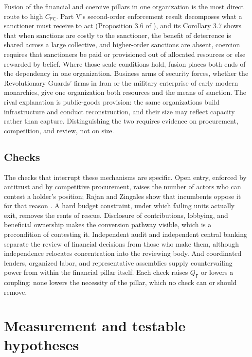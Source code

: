 \documentclass[11pt,letterpaper]{article}
\theoremstyle{definition}
\theoremstyle{remark}
\newcommand{\pF}{\mathsf{F}}
\newcommand{\pC}{\mathsf{C}}
\begin{document}
Fusion of the financial and coercive pillars in one organization is the most direct route to high $C_{\pF\pC}$. Part V's second-order enforcement result decomposes what a sanctioner must receive to act (Proposition 3.6 of \citealt{long2026coercive}), and its Corollary 3.7 shows that when sanctions are costly to the sanctioner, the benefit of deterrence is shared across a large collective, and higher-order sanctions are absent, coercion requires that sanctioners be paid or provisioned out of allocated resources or else rewarded by belief. Where those scale conditions hold, fusion places both ends of the dependency in one organization. Business arms of security forces, whether the Revolutionary Guards' firms in Iran \citep{wehrey2009} or the military enterprise of early modern monarchies, give one organization both resources and the means of sanction. The rival explanation is public-goods provision: the same organizations build infrastructure and conduct reconstruction, and their size may reflect capacity rather than capture. Distinguishing the two requires evidence on procurement, competition, and review, not on size.

\subsection{Checks}

The checks that interrupt these mechanisms are specific. Open entry, enforced by antitrust and by competitive procurement, raises the number of actors who can contest a holder's position; Rajan and Zingales show that incumbents oppose it for that reason \citep{rajan2003}. A hard budget constraint, under which failing units actually exit, removes the rents of rescue. Disclosure of contributions, lobbying, and beneficial ownership makes the conversion pathway visible, which is a precondition of contesting it. Independent audit and independent central banking separate the review of financial decisions from those who make them, although independence relocates concentration into the reviewing body. And coordinated lenders, organized labor, and representative assemblies supply countervailing power from within the financial pillar itself. Each check raises $Q_{\pF}$ or lowers a coupling; none lowers the necessity of the pillar, which no check can or should remove.

\section{Measurement and testable hypotheses}
\label{sec:measurement}
\end{document}
